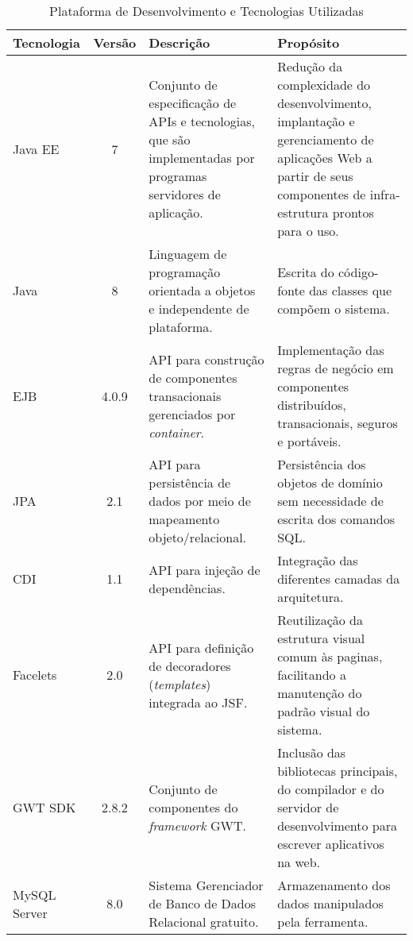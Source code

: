 \begin{table}[h]
	\centering	
	\vspace{0.5cm}
	\footnotesize
	\caption{Plataforma de Desenvolvimento e Tecnologias Utilizadas}	
	\label{tabela-plataforma}
	\begin{tabular}{|p{1.6cm}|c|p{5cm}|p{6.5cm}|}  \hline 
 		Tecnologia & Versão & Descrição & Propósito \\\hline 
 		
		Java EE & 7 & Conjunto de especificação de APIs e tecnologias, que são implementadas por programas servidores de aplicação. & Redução da complexidade do desenvolvimento, implantação e gerenciamento de aplicações Web a partir de seus componentes de infra-estrutura prontos para o uso. \\ \hline

		Java & 8 & Linguagem de programação orientada a objetos e independente de plataforma. & Escrita do código-fonte das classes que compõem o sistema. \\\hline
		
		EJB & 4.0.9 & API para construção de componentes transacionais gerenciados por \textit{container}. & Implementação das regras de negócio em componentes distribuídos, transacionais, seguros e portáveis. \\\hline
		
		JPA & 2.1 & API para persistência de dados por meio de mapeamento objeto/relacional. & Persistência dos objetos de domínio sem necessidade de escrita dos comandos SQL. \\\hline
		
		CDI & 1.1 & API para injeção de dependências. & Integração das diferentes camadas da arquitetura. \\\hline
		
		Facelets & 2.0 &  API para definição de decoradores (\textit{templates}) integrada ao JSF. & Reutilização da estrutura visual comum às paginas, facilitando a manutenção do padrão visual do sistema. \\\hline
		
		GWT SDK & 2.8.2 &  Conjunto de componentes do \textit{framework} GWT. & Inclusão das bibliotecas principais, do compilador e do servidor de desenvolvimento para escrever aplicativos na web. \\\hline
		
		MySQL Server & 8.0 & Sistema Gerenciador de Banco de Dados Relacional gratuito. & Armazenamento dos dados manipulados pela ferramenta. \\\hline
		

\end{tabular}
\end{table}
